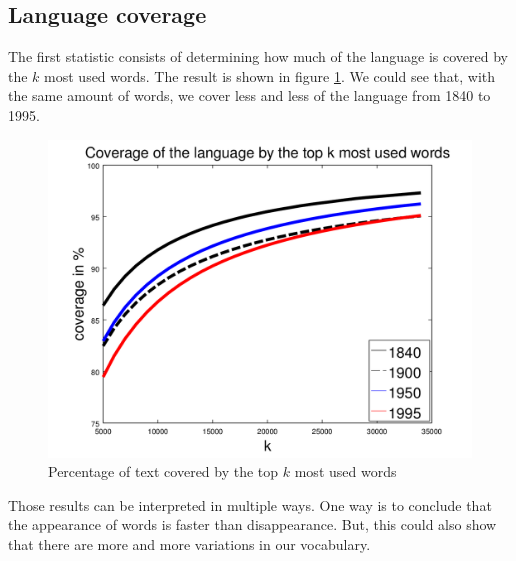 \subsection{Language coverage}

The first statistic consists of determining how much of the language is covered by the $k$ most used words. The result is shown in figure \ref{coverage_figure}. We could see that, with the same amount of words, we cover less and less of the language from 1840 to 1995.

\begin{figure}[H]
	\centering
    \includegraphics[scale=0.50]{Pictures/statistics/top-k-words-coverage/coverage.png}
    \caption{Percentage of text covered by the top $k$ most used words}
    \label{coverage_figure}
\end{figure}

Those results can be interpreted in multiple ways. One way is to conclude that the appearance of words is faster than disappearance. But, this could also show that there are more and more variations in our vocabulary.